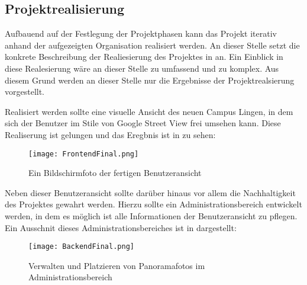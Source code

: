 \subsection{Projektrealisierung}
\label{sec:Projektrealisierung}

Aufbauend auf der Festlegung der Projektphasen kann das Projekt iterativ anhand der aufgezeigten Organisation
realisiert werden. An dieser Stelle setzt die konkrete Beschreibung der Realiesierung des
Projektes in \citet{modelierungUndBetrieb2014} an.
Ein Einblick in diese Realesierung wäre an dieser Stelle zu umfassend und zu komplex. Aus diesem Grund werden an dieser
Stelle nur die Ergebnisse der Projektrealsierung vorgestellt.

Realisiert werden sollte eine visuelle Ansicht des neuen Campus Lingen, in dem sich der Benutzer im Stile von Google
Street View frei umsehen kann. Diese Realiserung ist gelungen und das Eregbnis ist in 
zu sehen:

\begin{figure}[htb] 
\centering
\texttt{[image: FrontendFinal.png]}
\caption[Abbildung der Benutzeransicht]{Ein Bildschirmfoto der fertigen Benutzeransicht\protect}
\label{fig:FrontendFinal}
\end{figure}

Neben dieser Benutzeransicht sollte darüber hinaus vor allem die Nachhaltigkeit des Projektes gewahrt werden.
Hierzu sollte ein Administrationsbereich entwickelt werden, in dem es möglich ist alle Informationen
der Benutzeransicht zu pflegen. Ein Ausschnit dieses Administrationsbereiches ist 
in  dargestellt:

\begin{figure}[htb] 
\centering
\texttt{[image: BackendFinal.png]}
\caption[Ausschnitt des Administrationsbereiches]{Verwalten und Platzieren von Panoramafotos im Administrationsbereich\protect}
\label{fig:BackendFinal}
\end{figure}